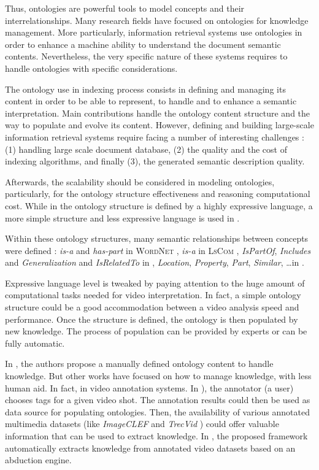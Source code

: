 		Thus,  ontologies are powerful tools to model concepts and their interrelationships. 
		Many research fields have focused on ontologies for knowledge management. 
		More particularly, information retrieval systems use ontologies in order 
		to enhance a machine ability to understand  the document semantic contents. 
		Nevertheless, the very specific nature of these systems requires to
		handle ontologies with specific considerations.
	
		The ontology use in indexing process consists in defining and managing its content in order to 
		be able to represent, to handle and to enhance a semantic interpretation. Main contributions 
		handle the ontology content structure and the way to populate and evolve its content. However, 
		defining and building large-scale information retrieval systems require facing a number of 
		interesting challenges \citep{Dean2009} : (1) handling large scale document database, 
		(2) the quality and the cost of indexing algorithms, and finally (3), the generated semantic description quality.

		Afterwards, the scalability should be considered in modeling ontologies, particularly, for the ontology
		structure effectiveness and reasoning computational cost. While in \citep{Paliouras2011,Bannour2013}
		the ontology structure is defined by a highly expressive language, a more simple structure and less 
		expressive language is used in \citep{lscom2006,Vallet2007,Mylonas2008,Mylonas2009,Fellbaum2010,Elleuch2011}. 

		Within these ontology structures, many semantic relationships between concepts were defined : \emph{is-a} 
		and \emph{has-part} in \textsc{WordNet} \citep{Fellbaum2010}, \emph{is-a} in \textsc{LsCom} 
		\citep{lscom2006}, \emph{IsPartOf}, \emph{Includes} and \emph{Generalization} and \emph{IsRelatedTo} 
		in \citep{Elleuch2011}, \emph{Location}, \emph{Property}, \emph{Part}, \emph{Similar}, 
		\dots in \citep{Mylonas2008,Mylonas2009}. 

		Expressive language level is tweaked by paying attention to the huge amount of computational tasks 
		needed for video interpretation. In fact, a simple ontology structure could be a good accommodation 
		between a video analysis speed and performance. Once the structure is defined, the ontology is 
		then populated by new knowledge. The process of population can be provided by experts or can be fully automatic.
			
		In \citep{KARA2010,Sari2010,Bannour2013}, the authors propose a manually defined ontology content to handle 
		knowledge.  But other works have focused on how to manage knowledge, with less human aid. In fact, 
		in video annotation systems. In \citep{Volkmer2005, Ayache2007}), the annotator (a user) 
		chooses tags for a given video shot. The annotation results could then be used as data source 
		for populating ontologies. Then, the availability of various annotated multimedia datasets 
		(like \emph{ImageCLEF} \citep{Thomee2012} and \emph{TrecVid} \citep{Smeaton2006}) could offer valuable
		information that can be used to extract knowledge. In \citep{Elleuch2011}, the proposed 
		framework automatically extracts knowledge from annotated video datasets based on an abduction engine. 


